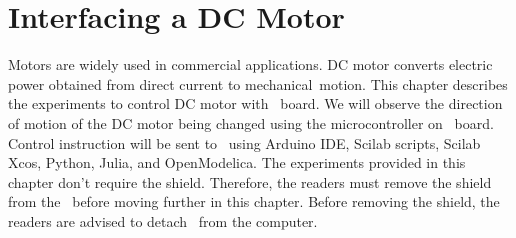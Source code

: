 \chapter{Interfacing a DC Motor}
\thispagestyle{empty}
\label{dcmotor}
\newcommand{\LocDCMfig}{\Origin/user-code/dcmotor/figures}
\newcommand{\LocDCMscicode}{\Origin/user-code/dcmotor/scilab}
\newcommand{\LocDCMscibrief}[1]{{\tt \seqsplit{
        Origin/user-code/dcmotor/scilab/#1}},
  see \fnrefp{fn:file-loc}}
\newcommand{\LocDCMardcode}{\Origin/user-code/dcmotor/arduino}
\newcommand{\LocDCMardbrief}[1]{{\tt \seqsplit{
        Origin/user-code/dcmotor/arduino/#1}},
  see \fnrefp{fn:file-loc}}

\newcommand{\LocDCMpycode}{\Origin/user-code/dcmotor/python}
\newcommand{\LocDCMpybrief}[1]{{\tt \seqsplit{
        Origin/user-code/dcmotor/python/#1}},
  see \fnrefp{fn:file-loc}}

\newcommand{\LocDCMjuliacode}{\Origin/user-code/dcmotor/julia}
\newcommand{\LocDCMjuliabrief}[1]{{\tt \seqsplit{
        Origin/user-code/dcmotor/julia/#1}},
  see \fnrefp{fn:file-loc}}

\newcommand{\LocDCMOpenModelicacode}{\Origin/user-code/dcmotor/OpenModelica}  %
\newcommand{\LocDCMOpenModelicabrief}[1]{{\tt \seqsplit{%
        Origin/user-code/led/OpenModelica/#1}}, see \fnrefp{fn:file-loc}} %


Motors are widely used in commercial applications. 
DC motor converts electric power obtained from direct current to 
mechanical motion. This chapter describes the experiments to 
control DC motor with \arduino\ board. We will observe the 
direction of motion of the DC motor being changed 
using the microcontroller on \arduino\ board. 
Control instruction will be sent to \arduino\ using Arduino IDE, 
Scilab scripts, Scilab Xcos, Python, Julia, and OpenModelica. 
The experiments provided in this chapter don't require the shield. 
Therefore, the readers must remove the shield from the \arduino\ before 
moving further in this chapter. Before removing the shield, 
the readers are advised to detach \arduino\ from the computer. 

